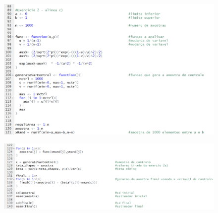 \documentclass{article}
\begin{document}
				\newpage
				\begin{figure}[!h]
						\includegraphics[scale=0.6]{ex2c)}
				\end{figure}	
				\begin{figure}[!h]
						\includegraphics[scale=0.6]{ex2c)cont}
				\end{figure}	
	
\end{document}

